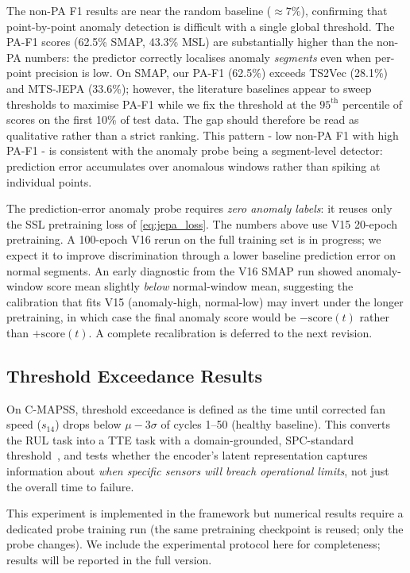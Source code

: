 \documentclass{article}
\newcommand{\plannedc}[1]{{\color{blue}#1}}
\newcommand{\plannedc}[1]{#1}
\begin{document}
The non-PA F1 results are near the random baseline ($\approx7\%$), confirming that point-by-point anomaly detection is difficult with a single global threshold. The PA-F1 scores (62.5\% SMAP, 43.3\% MSL) are substantially higher than the non-PA numbers: the predictor correctly localises anomaly \emph{segments} even when per-point precision is low. On SMAP, our PA-F1 (62.5\%) exceeds TS2Vec (28.1\%) and MTS-JEPA (33.6\%); however, the literature baselines appear to sweep thresholds to maximise PA-F1 while we fix the threshold at the $95^\text{th}$ percentile of scores on the first 10\% of test data. The gap should therefore be read as qualitative rather than a strict ranking. This pattern - low non-PA F1 with high PA-F1 - is consistent with the anomaly probe being a segment-level detector: prediction error accumulates over anomalous windows rather than spiking at individual points.

The prediction-error anomaly probe requires \emph{zero anomaly labels}: it reuses only the SSL pretraining loss of \cref{eq:jepa_loss}. The numbers above use V15 20-epoch pretraining. \plannedc{A 100-epoch V16 rerun on the full training set is in progress; we expect it to improve discrimination through a lower baseline prediction error on normal segments. An early diagnostic from the V16 SMAP run showed anomaly-window score mean slightly \emph{below} normal-window mean, suggesting the calibration that fits V15 (anomaly-high, normal-low) may invert under the longer pretraining, in which case the final anomaly score would be $-\mathrm{score}(t)$ rather than $+\mathrm{score}(t)$. A complete recalibration is deferred to the next revision.}

\subsection{Threshold Exceedance Results}
\label{sec:tte_results}

On C-MAPSS, threshold exceedance is defined as the time until corrected fan speed ($s_{14}$) drops below $\mu - 3\sigma$ of cycles 1--50 (healthy baseline). This converts the RUL task into a TTE task with a domain-grounded, SPC-standard threshold~\citep{montgomery2020spc}, and tests whether the encoder's latent representation captures information about \emph{when specific sensors will breach operational limits}, not just the overall time to failure.

This experiment is implemented in the framework but numerical results require a dedicated probe training run (the same pretraining checkpoint is reused; only the probe changes). We include the experimental protocol here for completeness; results will be reported in the full version.
\end{document}
